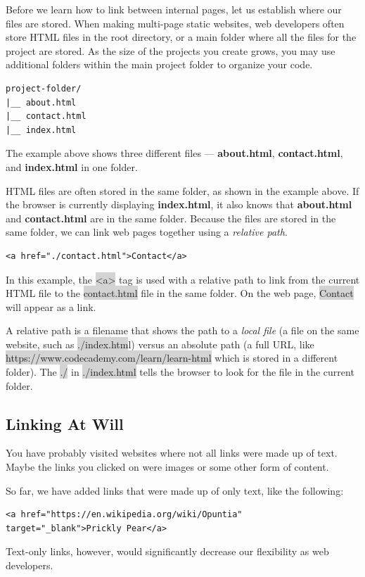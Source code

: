 \documentclass[11pt]{article}
\begin{document}
Before we learn how to link between internal pages, let us establish where our files are stored. When making multi-page static websites, web developers often store HTML files in the root directory, or a main folder where all the files for the project are stored. As the size of the projects you create grows, you may use additional folders within the main project folder to organize your code.
\begin{lstlisting}[basicstyle=\small\ttfamily\color{theWhite}, backgroundcolor = \color{theBlack}, language = Comment]
project-folder/
|__ about.html
|__ contact.html
|__ index.html
\end{lstlisting}
The example above shows three different files — \textbf{about.html}, \textbf{contact.html}, and \textbf{index.html} in one folder.

HTML files are often stored in the same folder, as shown in the example above. If the browser is currently displaying \textbf{index.html}, it also knows that \textbf{about.html} and \textbf{contact.html} are in the same folder. Because the files are stored in the same folder, we can link web pages together using a \textit{relative path}.
\begin{lstlisting}
<a href="./contact.html">Contact</a>
\end{lstlisting}
In this example, the \colorbox{lightgray}{<a>} tag is used with a relative path to link from the current HTML file to the \colorbox{lightgray}{contact.html} file in the same folder. On the web page, \colorbox{lightgray}{Contact} will appear as a link.

A relative path is a filename that shows the path to a \textit{local file} (a file on the same website, such as \colorbox{lightgray}{./index.htm}l) versus an absolute path (a full URL, like \colorbox{lightgray}{https://www.codecademy.com/learn/learn-html} which is stored in a different folder). The \colorbox{lightgray}{./} in \colorbox{lightgray}{./index.html} tells the browser to look for the file in the current folder.

\subsection{Linking At Will}
You have probably visited websites where not all links were made up of text. Maybe the links you clicked on were images or some other form of content.

So far, we have added links that were made up of only text, like the following:
\begin{lstlisting}
<a href="https://en.wikipedia.org/wiki/Opuntia"
target="_blank">Prickly Pear</a>
\end{lstlisting}
Text-only links, however, would significantly decrease our flexibility as web developers.
\end{document}
